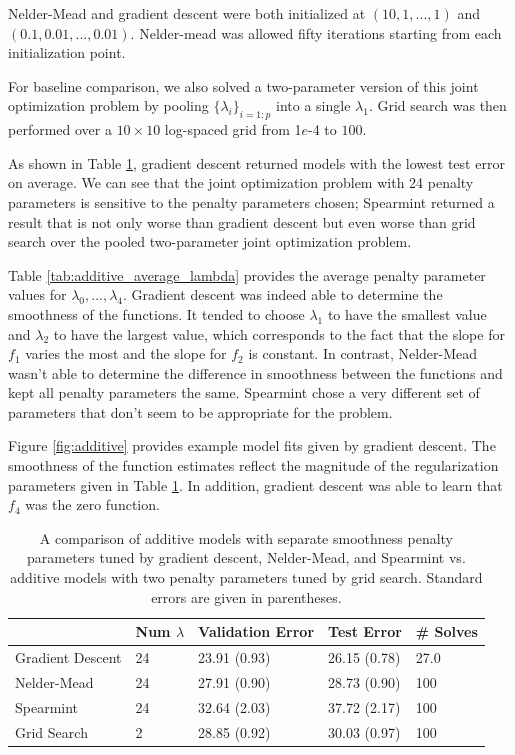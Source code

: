 \documentclass[12pt]{article}
\begin{document}
Nelder-Mead and gradient descent were both initialized at $(10, 1, ..., 1)$ and $(0.1, 0.01, ..., 0.01)$. Nelder-mead was allowed fifty iterations starting from each initialization point.

For baseline comparison, we also solved a two-parameter version of this joint optimization problem by pooling $\{\lambda_i\}_{i=1:p}$ into a single $\lambda_1$. Grid search was then performed over a $10 \times 10$ log-spaced grid from 1$e$-4 to $100$. 

As shown in Table \ref{tab:additive}, gradient descent returned models with the lowest test error on average. We can see that the joint optimization problem with 24 penalty parameters is sensitive to the penalty parameters chosen; Spearmint returned a result that is not only worse than gradient descent but even worse than grid search over the pooled two-parameter joint optimization problem.

Table \ref{tab:additive_average_lambda} provides the average penalty parameter values for $\lambda_0, ..., \lambda_4$. Gradient descent was indeed able to determine the smoothness of the functions. It tended to choose $\lambda_1$ to have the smallest value and $\lambda_2$ to have the largest value, which corresponds to the fact that the slope for $f_1$ varies the most and the slope for $f_2$ is constant. In contrast, Nelder-Mead wasn't able to determine the difference in smoothness between the functions and kept all penalty parameters the same. Spearmint chose a very different set of parameters that don't seem to be appropriate for the problem.

Figure \ref{fig:additive} provides example model fits given by gradient descent. The smoothness of the function estimates reflect the magnitude of the regularization parameters given in Table \ref{tab:additive}. In addition, gradient descent was able to learn that $f_4$ was the zero function.

\begin{table}
\caption {\label{tab:additive} A comparison of additive models with separate smoothness penalty parameters tuned by gradient descent, Nelder-Mead, and Spearmint vs. additive models with two penalty parameters tuned by grid search. Standard errors are given in parentheses.}
\centering
\begin{tabular}{| l | l | l | l | l | }
\hline
& Num $\lambda$ & Validation Error & Test Error & \# Solves\\
\hline
Gradient Descent & 24 & 23.91 (0.93) & 26.15 (0.78) & 27.0 \\
\hline
Nelder-Mead & 24 & 27.91 (0.90) & 28.73 (0.90) & 100 \\
\hline
Spearmint & 24 & 32.64 (2.03) & 37.72 (2.17) & 100 \\
\hline
Grid Search & 2 & 28.85 (0.92) & 30.03 (0.97) & 100 \\
\hline
\end{tabular}
\end{table}
\end{document}
